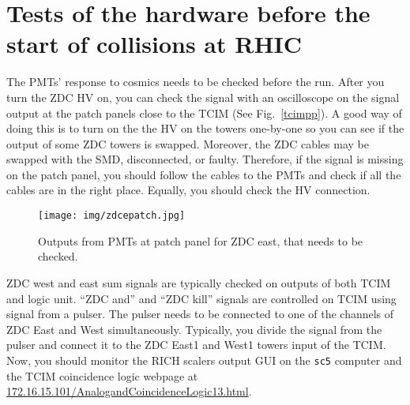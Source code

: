 \chapter{Tests of the hardware before the start of collisions at RHIC}
The PMTs' response to cosmics needs to be checked before the run. After you turn the ZDC HV on, you can check the signal with an oscilloscope on the signal output at the patch panels close to the TCIM (See Fig.~\ref{tcimpp}). A good way of doing this is to turn on the the HV on the towers one-by-one so you can see if the output of some ZDC towers is swapped.
Moreover, the ZDC cables may be swapped with the SMD, disconnected, or faulty. Therefore, if the signal is missing on the patch panel, you should follow the cables to the PMTs and check if all the cables are in the right place. Equally, you should check the HV connection.

\begin{figure}[htb]
\begin{center}
\texttt{[image: img/zdcepatch.jpg]}
\end{center}
\caption{Outputs from PMTs at patch panel for ZDC east, that needs to be checked.}
\label{zdcepatch}
\end{figure}

ZDC west and east sum signals are typically checked on outputs of both TCIM and logic unit. ``ZDC and'' and ``ZDC kill'' signals are controlled on TCIM using  signal from a pulser. The pulser needs to be connected to one of the channels of ZDC East and West simultaneously. Typically, you divide the signal from the pulser and connect it to the ZDC East1 and West1 towers input of the TCIM\@. Now, you should monitor the RICH scalers output GUI on the \texttt{sc5} computer and the TCIM coincidence logic webpage at \url{172.16.15.101/AnalogandCoincidenceLogic13.html}.
